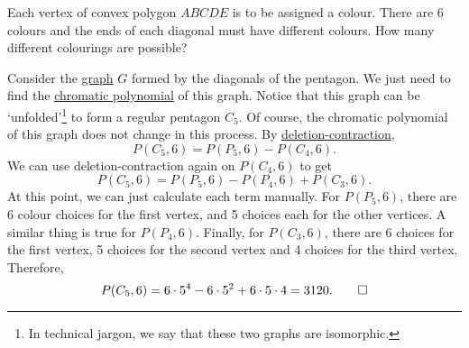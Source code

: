 \begin{question}
    Each vertex of convex polygon $ABCDE$ is to be assigned a colour. There are
    6 colours and the ends of each diagonal must have different colours. How
    many different colourings are possible?
\end{question}
\begin{solution}
    Consider the \hyperref[def: graph]{graph} $G$ formed by the diagonals of
    the pentagon. We just need to find the \hyperref[def:
    chromaticpoly]{chromatic polynomial} of this graph. Notice that this graph
    can be `unfolded'\footnote{In technical jargon, we say that these two
    graphs are isomorphic.} to form a regular pentagon $C_5$. Of course, the
    chromatic polynomial of this graph does not change in this process. By
    \hyperref[teq: DC]{deletion-contraction},
    \[ P(C_5, 6) = P(P_5, 6) - P(C_4, 6). \]
    We can use deletion-contraction again on $P(C_4, 6)$ to get
    \[ P(C_5, 6) = P(P_5, 6) - P(P_4, 6) + P(C_3, 6). \]
    At this point, we can just calculate each term manually. For $P(P_5, 6)$,
    there are 6 colour choices for the first vertex, and 5 choices each for
    the other vertices. A similar thing is true for $P(P_4, 6)$. Finally, for
    $P(C_3, 6)$, there are 6 choices for the first vertex, 5 choices for the
    second vertex and 4 choices for the third vertex. Therefore,
    \[ P(C_5, 6) = 6 \cdot 5^4 - 6 \cdot 5^2 + 6 \cdot 5 \cdot 4 = 3120. \qedhere \]
\end{solution}
